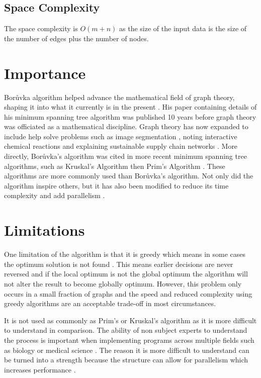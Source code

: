 \documentclass[a4paper,11pt]{article}
\begin{document}
\subsection{Space Complexity}
The space complexity is $O(m + n)$ as the size of the input data is the size of the number of edges plus the number of nodes.
\section{Importance}
Borůvka algorithm helped advance the mathematical field of graph theory, shaping it into what it currently is in the present \cite{neuman199495}. His paper containing details of his minimum spanning tree algorithm was published 10 years before graph theory was officiated as a mathematical discipline. Graph theory has now expanded to include help solve problems such as image segmentation \cite{basavaprasad2014survey}, noting interactive chemical reactions \cite{gowda2021recent} and explaining sustainable supply chain networks \cite{luo2018explaining}.
 More directly, Borůvka's algorithm was cited in more recent minimum spanning tree algorithms, such as Kruskal's Algorithm \cite{kruskal1956shortest} then Prim's Algorithm \cite{prim1957shortest}. These algorithms are more commonly used than Borůvka's algorithm. Not only did the algorithm inspire others, but it has also been modified to reduce its time complexity and add parallelism \cite{7092783}. 
 
\section{Limitations}
 One limitation of the algorithm is that it is greedy which means in some cases the optimum solution is not found \cite{BANGJENSEN2004121}. This means earlier decisions are never reversed and if the local optimum is not the global optimum the algorithm will not alter the result to become globally optimum.
 However, this problem only occurs in a small fraction of graphs and the speed and reduced complexity using greedy algorithms are an acceptable trade-off in most circumstances.
 
 It is not used as commonly as Prim's or Kruskal's algorithm as it is more difficult to understand in comparison. The ability of non subject experts to understand the process is important when implementing programs across multiple fields such as biology or medical science \cite{loftus2022ideal}. 
The reason it is more difficult to understand can be turned into a strength because the structure can allow for parallelism which increases performance \cite{7092783}.
 
\end{document}
